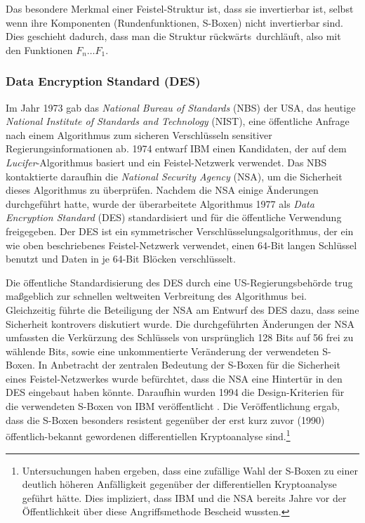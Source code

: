 Das besondere Merkmal einer Feistel-Struktur ist, dass sie invertierbar
ist, selbst wenn ihre Komponenten (Rundenfunktionen, S-Boxen) nicht
invertierbar sind. Dies geschieht dadurch, dass man die Struktur \glqq
rückwärts\grqq~durchläuft, also mit den Funktionen $F_n \dots F_1$.

\subsubsection{Data Encryption Standard (DES)}
\label{sssec:des}
Im Jahr 1973 gab das \emph{National Bureau of Standards} (NBS) der USA,
das heutige \emph{National Institute of Standards and Technology}
(NIST), eine öffentliche Anfrage nach einem Algorithmus zum sicheren
Verschlüsseln sensitiver Regierungsinformationen ab. 1974 entwarf IBM
einen Kandidaten, der auf dem \emph{Lucifer}-Algorithmus basiert und ein
Feistel-Netzwerk verwendet. Das NBS kontaktierte daraufhin die
\emph{National Security Agency} (NSA), um die Sicherheit dieses
Algorithmus zu überprüfen. Nachdem die NSA einige Änderungen
durchgeführt hatte, wurde der überarbeitete Algorithmus 1977 als
\emph{Data Encryption Standard} (DES)\indexDES \cite{NIST_DES99}
standardisiert und für die öffentliche Verwendung freigegeben. Der DES
ist ein symmetrischer Verschlüsselungsalgorithmus, der ein wie oben
beschriebenes Feistel-Netzwerk verwendet, einen 64-Bit langen Schlüssel
benutzt und Daten in je 64-Bit Blöcken verschlüsselt.  

Die öffentliche Standardisierung des DES durch eine US-Regierungsbehörde
trug maßgeblich zur schnellen weltweiten Verbreitung des Algorithmus
bei. Gleichzeitig führte die Beteiligung der NSA am Entwurf des DES
dazu, dass seine Sicherheit kontrovers diskutiert wurde. Die
durchgeführten Änderungen der NSA umfassten die Verkürzung des
Schlüssels von ursprünglich 128 Bits auf 56 frei zu wählende Bits, sowie
eine unkommentierte Veränderung der verwendeten S-Boxen. In Anbetracht
der zentralen Bedeutung der S-Boxen für die Sicherheit eines
Feistel-Netzwerkes wurde befürchtet, dass die NSA eine Hintertür in den
DES eingebaut haben könnte. Daraufhin wurden 1994 die Design-Kriterien
für die verwendeten S-Boxen von IBM veröffentlicht
\cite{Coppersmith1994}. Die Veröffentlichung ergab, dass die S-Boxen
besonders resistent gegenüber der erst kurz zuvor (1990)
öffentlich-bekannt gewordenen differentiellen Kryptoanalyse
sind.\footnote{Untersuchungen haben ergeben, dass eine zufällige Wahl
  der S-Boxen zu einer deutlich höheren Anfälligkeit gegenüber der
  differentiellen Kryptoanalyse geführt hätte. Dies impliziert, dass IBM
  und die NSA bereits Jahre vor der Öffentlichkeit über diese
  Angriffsmethode Bescheid wussten.} 

